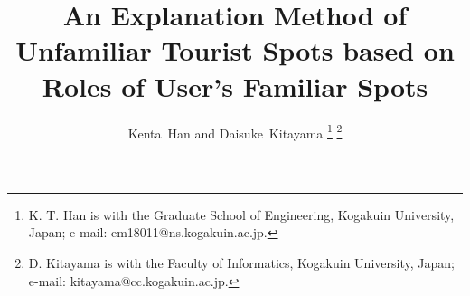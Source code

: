 \documentclass[journal]{IAENGtran}
\begin{document}
%
\title{An Explanation Method of Unfamiliar Tourist Spots based on Roles of User's Familiar Spots}
%
%
%

\author{Kenta~Han and Daisuke~Kitayama
\thanks{K. T. Han is with the Graduate School of Engineering, Kogakuin University, Japan; e-mail: em18011@ns.kogakuin.ac.jp.}%
\thanks{D. Kitayama is with the Faculty of Informatics, Kogakuin University, Japan;  e-mail: kitayama@cc.kogakuin.ac.jp.}}%

\maketitle

\pagestyle{empty}
\thispagestyle{empty}
\end{document}

